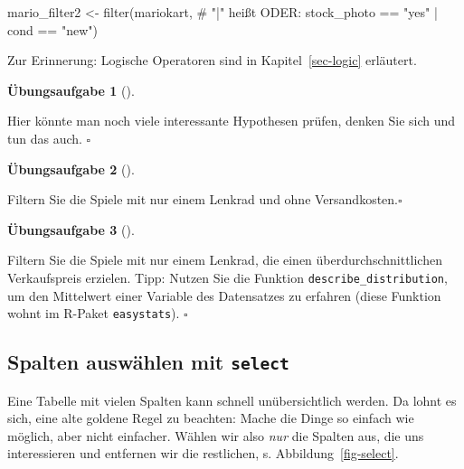 \documentclass[
  letterpaper,
]{scrbook}
\newenvironment{Shaded}{\begin{snugshade}}{\end{snugshade}}
\newcommand{\CommentTok}[1]{\textcolor[rgb]{0.37,0.37,0.37}{#1}}
\newcommand{\FunctionTok}[1]{\textcolor[rgb]{0.28,0.35,0.67}{#1}}
\newcommand{\NormalTok}[1]{\textcolor[rgb]{0.00,0.23,0.31}{#1}}
\newcommand{\OtherTok}[1]{\textcolor[rgb]{0.00,0.23,0.31}{#1}}
\newcommand{\SpecialCharTok}[1]{\textcolor[rgb]{0.37,0.37,0.37}{#1}}
\newcommand{\StringTok}[1]{\textcolor[rgb]{0.13,0.47,0.30}{#1}}
\theoremstyle{definition}
\theoremstyle{definition}
\theoremstyle{definition}
\newtheorem{exercise}{Übungsaufgabe}[chapter]
\theoremstyle{remark}
\begin{document}
\begin{Shaded}
\begin{Highlighting}[]
\NormalTok{mario\_filter2 }\OtherTok{\textless{}{-}} 
  \FunctionTok{filter}\NormalTok{(mariokart,  }\CommentTok{\# "|" heißt ODER:}
\NormalTok{         stock\_photo }\SpecialCharTok{==} \StringTok{"yes"} \SpecialCharTok{|}\NormalTok{ cond }\SpecialCharTok{==} \StringTok{"new"}\NormalTok{)}
\end{Highlighting}
\end{Shaded}

Zur Erinnerung: Logische Operatoren sind in Kapitel~\ref{sec-logic}
erläutert.

\begin{exercise}[]\protect\hypertarget{exr-hyps-filter}{}\label{exr-hyps-filter}

Hier könnte man noch viele interessante Hypothesen prüfen, denken Sie
sich und tun das auch. \(\square\)

\end{exercise}

\begin{exercise}[]\protect\hypertarget{exr-filter2}{}\label{exr-filter2}

Filtern Sie die Spiele mit nur einem Lenkrad und ohne
Versandkosten.\(\square\)

\end{exercise}

\begin{exercise}[]\protect\hypertarget{exr-filter3}{}\label{exr-filter3}

Filtern Sie die Spiele mit nur einem Lenkrad, die einen
überdurchschnittlichen Verkaufspreis erzielen. Tipp: Nutzen Sie die
Funktion \texttt{describe\_distribution}, um den Mittelwert einer
Variable des Datensatzes zu erfahren (diese Funktion wohnt im R-Paket
\texttt{easystats}). \(\square\)

\end{exercise}

\subsection{\texorpdfstring{Spalten auswählen mit
\texttt{select}}{Spalten auswählen mit select}}\label{spalten-auswuxe4hlen-mit-select}

Eine Tabelle mit vielen Spalten kann schnell unübersichtlich werden. Da
lohnt es sich, eine alte goldene Regel zu beachten: Mache die Dinge so
einfach wie möglich, aber nicht einfacher. Wählen wir also \emph{nur}
die Spalten aus, die uns interessieren und entfernen wir die restlichen,
s. Abbildung~\ref{fig-select}.
\end{document}
